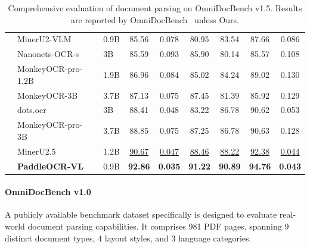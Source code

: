 \documentclass[11pt, a4paper,logo,  copyright, nonumbering]{paddleocr}
\begin{document}
\begin{table}[H]
{\begin{tabular}{l|ll|c|c c c c c}
        & MinerU2-VLM~\cite{MinerU2} & 0.9B & 85.56 & 0.078 & 80.95 & 83.54 & 87.66 & 0.086 \\
        & Nanonets-OCR-s~\cite{Nanonets-OCR-S} & 3B & 85.59 & 0.093 & 85.90 & 80.14 & 85.57 & 0.108 \\
           & MonkeyOCR-pro-1.2B~\cite{li2025monkeyocr} & 1.9B & 86.96 & 0.084 & 85.02 & 84.24 & 89.02 & 0.130 \\
        & MonkeyOCR-3B~\cite{li2025monkeyocr} & 3.7B & 87.13 & 0.075 & 87.45 & 81.39 & 85.92 & 0.129 \\
        & dots.ocr~\cite{dotsocr} & 3B & 88.41 & 0.048 & 83.22 & 86.78 & 90.62 & 0.053 \\
      & MonkeyOCR-pro-3B~\cite{li2025monkeyocr} & 3.7B & 88.85 & 0.075 & 87.25 & 86.78 & 90.63 & 0.128 \\
        & MinerU2.5~\cite{niu2025mineru2} & 1.2B & \cellcolor{cyan!15}\underline{90.67} & \cellcolor{cyan!15}\underline{0.047} & \cellcolor{cyan!15}\underline{88.46} & \cellcolor{cyan!15}\underline{88.22} & \cellcolor{cyan!15}\underline{92.38} & \cellcolor{cyan!15}\underline{0.044} \\ 

        & \textbf{PaddleOCR-VL} &0.9B & \cellcolor{red!15}\textbf{92.86} & \cellcolor{red!15}\textbf{0.035} & \cellcolor{red!15}\textbf{91.22} & \cellcolor{red!15}\textbf{90.89} & \cellcolor{red!15}\textbf{94.76} & \cellcolor{red!15}\textbf{0.043} \\
        \bottomrule
    \end{tabular}%
    }
   \caption{Comprehensive evaluation of document parsing on OmniDocBench v1.5. Results are reported by OmniDocBench~\cite{ouyang2025omnidocbench} unless Ours.}
       \label{tab:omni15_performance}
\end{table}

\paragraph{OmniDocBench v1.0} A publicly available benchmark dataset specifically is designed to evaluate real-world document parsing capabilities. It comprises 981 PDF pages, spanning 9 distinct document types, 4 layout styles, and 3 language categories. 
\end{document}
